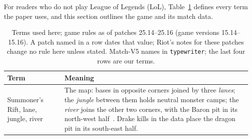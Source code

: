 For readers who do not play League of Legends (LoL), Table~\ref{tab:terms} defines every term the paper
uses, and this section outlines the game and its match data.

\begin{table}[!t]
\centering
\caption{Terms used here; game rules as of patches 25.14--25.16 (game versions 15.14--15.16). A patch
named in a row dates that value; Riot's notes for these patches change no rule here unless stated.
Match-V5 names in \texttt{typewriter}; the last four rows are our terms.}
\label{tab:terms}
\footnotesize
\renewcommand{\arraystretch}{1.05}
\setlength{\tabcolsep}{4pt}
\begin{tabularx}{\textwidth}{@{}>{\raggedright\arraybackslash}p{2.35cm}X@{}}
\toprule
\textbf{Term} & \textbf{Meaning} \\
\midrule
Summoner's Rift, lane, jungle, river &
  The map: bases in opposite corners joined by three \emph{lanes}; the \emph{jungle} between them holds
  neutral monster camps; the \emph{river} joins the other two corners, with the Baron pit in its north-west
  half~\cite{lolwiki2025summonersrift,lolwiki2026baron}. Drake kills in the data place the dragon pit in
  its south-east half. \\

\end{tabularx}
\end{table}
